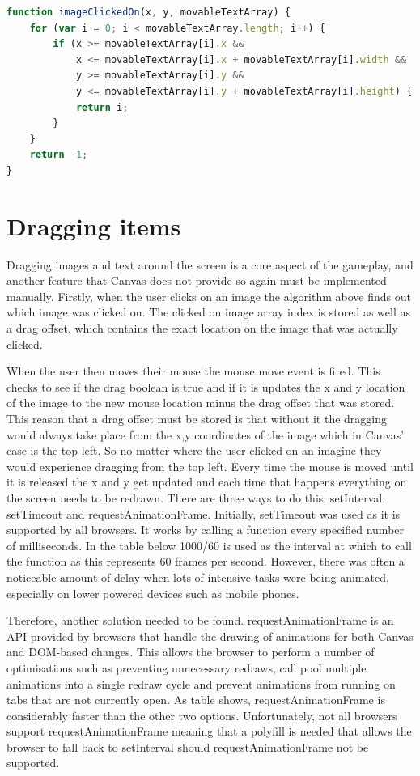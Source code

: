 \documentclass[12pt,a4paper]{report}
\begin{document}
\begin{lstlisting}[language=JavaScript]
function imageClickedOn(x, y, movableTextArray) {
    for (var i = 0; i < movableTextArray.length; i++) {
        if (x >= movableTextArray[i].x &&
            x <= movableTextArray[i].x + movableTextArray[i].width &&
            y >= movableTextArray[i].y &&
            y <= movableTextArray[i].y + movableTextArray[i].height) {
            return i;
        }
    }
    return -1;
}
\end{lstlisting}

\section{Dragging items}
Dragging images and text around the screen is a core aspect of the gameplay, and another feature that Canvas does not provide so again must be implemented manually. 
Firstly, when the user clicks on an image the algorithm above finds out which image was clicked on. The clicked on image array index is stored as well as a drag offset, which contains the exact location on the image that was actually clicked.

When the user then moves their mouse the mouse move event is fired. This checks to see if the drag boolean is true and if it is updates the x and y location of the image to the new mouse location minus the drag offset that was stored. This reason that a drag offset must be stored is that without it the dragging would always take place from the x,y coordinates of the image which in Canvas' case is the top left. So no matter where the user clicked on an imagine they would experience dragging from the top left. Every time the mouse is moved until it is released the x and y get updated and each time that happens everything on the screen needs to be redrawn. 
There are three ways to do this, setInterval, setTimeout and requestAnimationFrame. Initially, setTimeout was used as it is supported by all browsers. It works by calling a function every specified number of milliseconds. In the table below 1000/60 is used as the interval at which to call the function as this represents 60 frames per second. However, there was often a noticeable amount of delay when lots of intensive tasks were being animated, especially on lower powered devices such as mobile phones.

Therefore, another solution needed to be found. requestAnimationFrame is an API provided by browsers that handle the drawing of animations for both Canvas and DOM-based changes. This allows the browser to perform a number of optimisations such as preventing unnecessary redraws, call pool multiple animations into a single redraw cycle and prevent animations from running on tabs that are not currently open. As table shows, requestAnimationFrame is considerably faster than the other two options. Unfortunately, not all browsers support requestAnimationFrame meaning that a polyfill is needed that allows the browser to fall back to setInterval should requestAnimationFrame not be supported.
\end{document}
